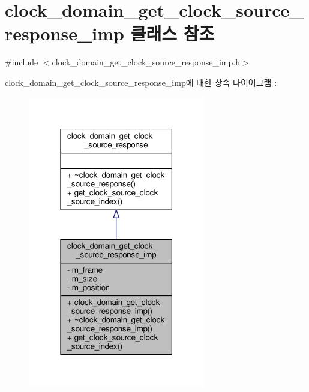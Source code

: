 \hypertarget{classavdecc__lib_1_1clock__domain__get__clock__source__response__imp}{}\section{clock\+\_\+domain\+\_\+get\+\_\+clock\+\_\+source\+\_\+response\+\_\+imp 클래스 참조}
\label{classavdecc__lib_1_1clock__domain__get__clock__source__response__imp}


{\ttfamily \#include $<$clock\+\_\+domain\+\_\+get\+\_\+clock\+\_\+source\+\_\+response\+\_\+imp.\+h$>$}



clock\+\_\+domain\+\_\+get\+\_\+clock\+\_\+source\+\_\+response\+\_\+imp에 대한 상속 다이어그램 \+: 
\nopagebreak
\begin{figure}[H]
\begin{center}
\leavevmode
\includegraphics[width=219pt]{classavdecc__lib_1_1clock__domain__get__clock__source__response__imp__inherit__graph}
\end{center}
\end{figure}


